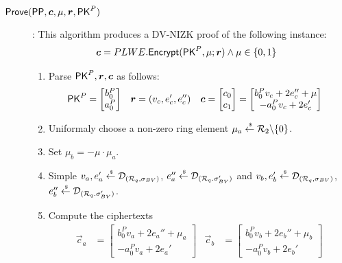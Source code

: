 \begin{description}
\item[$\Prove(\PPP, \vec{c}, \mu, \vec{r}, \PK^P)$]: This algorithm produces a DV-NIZK proof of the following instance:
  \begin{align*}
    \vec{c} &= PLWE.\Enc(\PK^P, \mu; \vec{r}) \wedge \mu \in \{0,1\}
  \end{align*}
  \begin{enumerate}
  \item Parse $\PK^P, \vec{r}, \vec{c}$ as follows:
    \begin{align*}
      \PK^P &= \begin{bmatrix} b_0^P \\ a_0^P \end{bmatrix} &
      \vec{r} &= (v_c, e_c', e_c'')&
      \vec{c} &= \begin{bmatrix} c_0\\ c_1\end{bmatrix} = \begin{bmatrix} b_0^P v_c + 2 e_c'' + \mu \\ -a_0^Pv_c + 2 e_c'\end{bmatrix}
    \end{align*}
  \item Uniformaly choose a non-zero ring element $\mu_a \stackrel{{\scriptscriptstyle \mkern4mu \$}}{\gets} {\mathcal{R}}_2 \backslash \{0\}$.
  \item Set $\mu_b = - \mu \cdot \mu_a$.
  \item Simple $v_a, e_a' \stackrel{{\scriptscriptstyle \mkern4mu \$}}{\gets} \mathcal{D}_{({\mathcal{R}}_q, \sigma_{BV})}$, $e_a'' \stackrel{{\scriptscriptstyle \mkern4mu \$}}{\gets} \mathcal{D}_{({\mathcal{R}}_q. \sigma_{BV}')}$ and $v_b, e_b' \stackrel{{\scriptscriptstyle \mkern4mu \$}}{\gets} \mathcal{D}_{({\mathcal{R}}_q, \sigma_{BV})}$, $e_b'' \stackrel{{\scriptscriptstyle \mkern4mu \$}}{\gets} \mathcal{D}_{({\mathcal{R}}_q. \sigma_{BV}')}$.
  \item Compute the ciphertexts
    \begin{align*}
      \vec{c}_a &= \begin{bmatrix} b_0^Pv_a + 2 e_a'' + \mu_a \\ - a_0^Pv_a + 2 e_a'\end{bmatrix} &
        \vec{c}_b &= \begin{bmatrix} b_0^Pv_b + 2 e_b'' + \mu_b \\ - a_0^Pv_b + 2 e_b'\end{bmatrix} 

\end{align*}
\end{enumerate}
\end{description}
